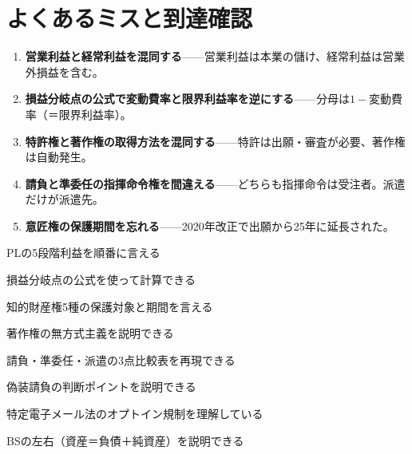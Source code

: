 \section{よくあるミスと到達確認}

\begin{yokumiss}[この章でよくあるミス]
\begin{enumerate}[leftmargin=1.6em, itemsep=5pt]
  \item \textbf{営業利益と経常利益を混同する}——営業利益は本業の儲け、経常利益は営業外損益を含む。
  \item \textbf{損益分岐点の公式で変動費率と限界利益率を逆にする}——分母は$1-$変動費率（＝限界利益率）。
  \item \textbf{特許権と著作権の取得方法を混同する}——特許は出願・審査が必要、著作権は自動発生。
  \item \textbf{請負と準委任の指揮命令権を間違える}——どちらも指揮命令は受注者。派遣だけが派遣先。
  \item \textbf{意匠権の保護期間を忘れる}——2020年改正で出願から25年に延長された。
\end{enumerate}
\end{yokumiss}

\begin{tatsaku}
  \item PLの5段階利益を順番に言える
  \item 損益分岐点の公式を使って計算できる
  \item 知的財産権5種の保護対象と期間を言える
  \item 著作権の無方式主義を説明できる
  \item 請負・準委任・派遣の3点比較表を再現できる
  \item 偽装請負の判断ポイントを説明できる
  \item 特定電子メール法のオプトイン規制を理解している
  \item BSの左右（資産＝負債＋純資産）を説明できる
\end{tatsaku}

